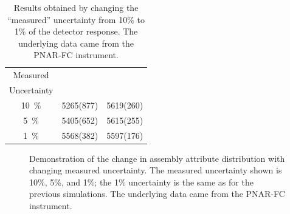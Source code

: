 \documentclass{ansnse}
\begin{document}
\begin{table}[h!]\centering
    \begin{tabular}{@{}S@{}S@{}S}
        \toprule
        {Measured} & {} & {} \\
        {Uncertainty} & & \\
        \midrule
        \SI{10}{\percent} & 5265(877) & 5619(260) \\
        \SI{5}{\percent}  & 5405(652) & 5615(255) \\
        \SI{1}{\percent}  & 5568(382) & 5597(176) \\
        \bottomrule
    \end{tabular}
    \caption{Results obtained by changing the ``measured'' uncertainty from 10\% to 1\% of the detector response.  The underlying data came from the PNAR-FC instrument.}
    \label{tab:CheckManyUncertainty}
\end{table}

\begin{figure}[hp!]\centering
     \qquad
    \caption{Demonstration of the change in assembly attribute distribution with changing measured uncertainty.  The measured uncertainty shown is 10\%, 5\%, and 1\%; the 1\% uncertainty is the same as for the previous simulations.  The underlying data came from the PNAR-FC instrument.}
    \label{fig:CheckManyUncertainty}
\end{figure}
    
\end{document}
